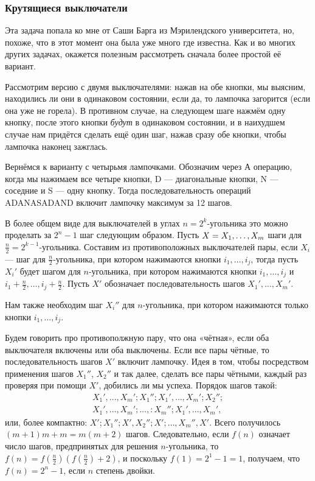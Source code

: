 \subsubsection*{Крутящиеся выключатели}%

Эта задача попала ко мне от Саши Барга из Мэрилендского университета, но, похоже, что в этот момент она была уже много где известна.
Как и во многих других задачах, окажется полезным рассмотреть сначала более простой её вариант.

\medskip

Рассмотрим версию с двумя выключателями: нажав на обе кнопки, мы выясним, находились ли они в одинаковом состоянии, если да, то лампочка загорится (если она уже не горела).
В противном случае, на следующем шаге нажмём одну кнопку, после этого кнопки \emph{будут} в одинаковом состоянии, и в наихудшем случае нам придётся сделать ещё один шаг, нажав сразу обе кнопки, чтобы лампочка наконец зажглась.

Вернёмся к варианту с четырьмя лампочками.
Обозначим через 
А операцию, когда мы нажимаем все четыре кнопки, 
D --- диагональные кнопки, 
N --- соседние и 
S --- одну кнопку.
Тогда последовательность операций ADANASADAND включит лампочку максимум за 12 шагов.

В более общем виде для выключателей в углах $n=2^k$-угольника это можно проделать за $2^{n}-1$ шаг следующим образом.
Пусть $X\z=X_1,\dots,X_m$ шаги для $\tfrac n2=2^{k-1}$-угольника.
Составим из противоположных выключателей пары, если $X_i$ --- шаг для $\tfrac n2$-угольника, при котором нажимаются кнопки $i_1,\dots,i_j$, тогда пусть $X_i'$ будет шагом для $n$-угольника, при котором нажимаются кнопки $i_1,\dots,i_j$ и $i_1+\tfrac n2,\dots,i_j+\tfrac n2$.
Пусть $X'$ обозначает последовательность шагов $X_1',\dots,X_m'$.

Нам также необходим шаг $X_i''$ для $n$-угольника, при котором нажимаются только кнопки $i_1,\dots,i_j$.

Будем говорить про противополжную пару, что она «чётная», если оба выключателя включены или оба выключены.
Если все пары чётные, то последовательность шагов $X'$ включит лампочку.
Идея в том, чтобы посредством применения шагов $X_1''$, $X_2''$ и так далее, сделать все пары чётными, каждый раз проверяя при помощи $X'$, добились ли мы успеха.
Порядок шагов такой:
\begin{align*}
X_1',\dots,X_m';X_1'';X_1',\dots,X_m';X_2'';
\\
X_1',\dots,X_m';\dots,:X_m'';X_1',\dots,X_m',
\end{align*}
или, более компактно: $X';X_1'';X',X_2'';X';\dots,X_m'',X'$.
Всего получилось $(m+1)m+m=m(m+2)$ шагов.
Следовательно, если $f(n)$ означает число шагов, предпринятых для решения $n$-угольника, то 
$f(n)=f(\tfrac n2)(f(\tfrac n2)+2)$,
и поскольку $f(1)=2^1-1=1$, получаем, что $f(n)=2^n-1$, если $n$ степень двойки.

